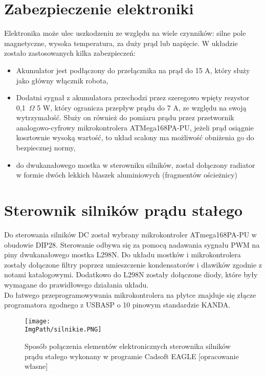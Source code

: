\documentclass[a4paper,12pt,twoside,openany]{report}
\newcommand{\ImgPath}{.}
\begin{document}
\section{Zabezpieczenie elektroniki}

Elektronika może ulec uszkodzeniu ze względu na wiele czynników: silne pole magnetyczne, wysoka temperatura, za duży prąd lub napięcie. W układzie zostało zastosowanych kilka zabezpieczeń:
\begin{itemize}
\item Akumulator jest podłączony do przełącznika na prąd do 15 A, który służy jako główny włącznik robota,
\item Dodatni sygnał z akumulatora przechodzi przez szeregowo wpięty rezystor 0,1~$\Omega$ 5 W, który ogranicza przepływ prądu do 7 A, ze względu na swoją wytrzymałość. Służy on również do pomiaru prądu przez przetwornik analogowo-cyfrowy mikrokontrolera ATMega168PA-PU, jeżeli prąd osiągnie kosztownie wysoką wartość, to układ scalony ma możliwość obniżenia go do bezpiecznej normy,
\item do dwukanałowego mostka w sterowniku silników, został dołączony radiator w formie dwóch lekkich blaszek aluminiowych (fragmentów ościeżnicy)
\end{itemize}

\section{Sterownik silników prądu stałego}

Do sterowania silników DC został wybrany mikrokontroler ATmega168PA-PU w obudowie DIP28. Sterowanie odbywa się za pomocą nadawania sygnału PWM na piny dwukanałowego mostka L298N. Do układu mostków i mikrokontrolera zostały dołączone filtry poprzez umieszczenie kondensatorów i dławików zgodnie z notami katalogowymi. Dodatkowo do L298N zostały dołączone diody, które były wymagane do prawidłowego działania układu. \\
Do łatwego przeprogramowywania mikrokontrolera na płytce znajduje się złącze programatora zgodnego z USBASP o 10 pinowym standardzie KANDA.

\begin{figure}[!htbp]
	\begin{center}
\centering
\texttt{[image: \\ImgPath/silnikie.PNG]}
\end{center}
	\caption{Sposób połączenia elementów elektronicznych sterownika silników prądu stałego wykonany w programie Cadsoft EAGLE [opracowanie własne]}
	\label{schematKomunikacji}
\end{figure}
\end{document}
